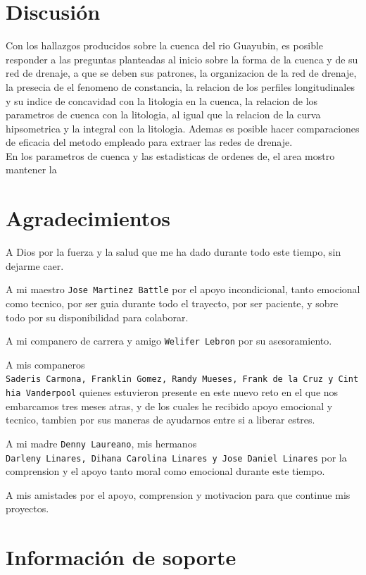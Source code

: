 \documentclass[11pt,]{article}
\begin{document}
\section{Discusión}\label{discusiuxf3n}

Con los hallazgos producidos sobre la cuenca del rio Guayubin, es
posible responder a las preguntas planteadas al inicio sobre la forma de
la cuenca y de su red de drenaje, a que se deben sus patrones, la
organizacion de la red de drenaje, la presecia de el fenomeno de
constancia, la relacion de los perfiles longitudinales y su indice de
concavidad con la litologia en la cuenca, la relacion de los parametros
de cuenca con la litologia, al igual que la relacion de la curva
hipsometrica y la integral con la litologia. Ademas es posible hacer
comparaciones de eficacia del metodo empleado para extraer las redes de
drenaje.\\
En los parametros de cuenca y las estadisticas de ordenes de, el area
mostro mantener la

\section{Agradecimientos}\label{agradecimientos}

A Dios por la fuerza y la salud que me ha dado durante todo este tiempo,
sin dejarme caer.

A mi maestro \texttt{Jose\ Martinez\ Battle} por el apoyo incondicional,
tanto emocional como tecnico, por ser guia durante todo el trayecto, por
ser paciente, y sobre todo por su disponibilidad para colaborar.

A mi companero de carrera y amigo \texttt{Welifer\ Lebron} por su
asesoramiento.

A mis companeros
\texttt{Saderis\ Carmona,\ Franklin\ Gomez,\ Randy\ Mueses,\ Frank\ de\ la\ Cruz\ y\ Cinthia\ Vanderpool}
quienes estuvieron presente en este nuevo reto en el que nos embarcamos
tres meses atras, y de los cuales he recibido apoyo emocional y tecnico,
tambien por sus maneras de ayudarnos entre si a liberar estres.

A mi madre \texttt{Denny\ Laureano}, mis hermanos
\texttt{Darleny\ Linares,\ Dihana\ Carolina\ Linares\ y\ Jose\ Daniel\ Linares}
por la comprension y el apoyo tanto moral como emocional durante este
tiempo.

A mis amistades por el apoyo, comprension y motivacion para que continue
mis proyectos.

\section{Información de soporte}\label{informaciuxf3n-de-soporte}
\end{document}
